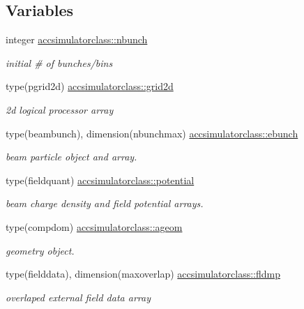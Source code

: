 \subsection*{Variables}
\begin{DoxyCompactItemize}
\item 
integer \mbox{\hyperlink{namespaceaccsimulatorclass_ae195202b2f2b61cf84479c9303847e9d}{accsimulatorclass\+::nbunch}}
\begin{DoxyCompactList}\small\item\em initial \# of bunches/bins \end{DoxyCompactList}\item 
type(pgrid2d) \mbox{\hyperlink{namespaceaccsimulatorclass_a7482c27516337dfcffc2711f52ed4063}{accsimulatorclass\+::grid2d}}
\begin{DoxyCompactList}\small\item\em 2d logical processor array \end{DoxyCompactList}\item 
type(beambunch), dimension(nbunchmax) \mbox{\hyperlink{namespaceaccsimulatorclass_a8da4a6c0ffe4700d0d0882e7d612d78c}{accsimulatorclass\+::ebunch}}
\begin{DoxyCompactList}\small\item\em beam particle object and array. \end{DoxyCompactList}\item 
type(fieldquant) \mbox{\hyperlink{namespaceaccsimulatorclass_a1cc972750a5e9da439930d5ce96bd399}{accsimulatorclass\+::potential}}
\begin{DoxyCompactList}\small\item\em beam charge density and field potential arrays. \end{DoxyCompactList}\item 
type(compdom) \mbox{\hyperlink{namespaceaccsimulatorclass_a7731609bfc9a7f895ee523fc43b42e6f}{accsimulatorclass\+::ageom}}
\begin{DoxyCompactList}\small\item\em geometry object. \end{DoxyCompactList}\item 
type(fielddata), dimension(maxoverlap) \mbox{\hyperlink{namespaceaccsimulatorclass_a32382286ea3f39a41f213e651b77deba}{accsimulatorclass\+::fldmp}}
\begin{DoxyCompactList}\small\item\em overlaped external field data array \end{DoxyCompactList}\item 

\end{DoxyCompactItemize}
